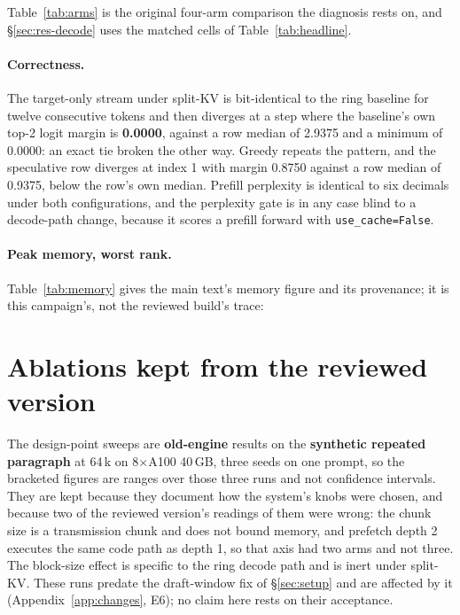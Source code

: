 \documentclass{article}
\begin{document}
Table~\ref{tab:arms} is the original four-arm comparison the diagnosis rests on, and
\S\ref{sec:res-decode} uses the matched cells of Table~\ref{tab:headline}.
\paragraph{Correctness.} The target-only stream under split-KV is bit-identical to the ring
baseline for twelve consecutive tokens and then diverges at a step where the baseline's own
top-2 logit margin is \textbf{0.0000}, against a row median of 2.9375 and a minimum of 0.0000:
an exact tie broken the other way. Greedy repeats the pattern, and the speculative row
diverges at index 1 with margin 0.8750 against a row median of 0.9375, below the row's own
median. Prefill perplexity is identical to six decimals under both configurations, and the
perplexity gate is in any case blind to a decode-path change, because it scores a prefill
forward with \texttt{use\_cache=False}.

\paragraph{Peak memory, worst rank.} Table~\ref{tab:memory} gives the main text's memory
figure and its provenance; it is this campaign's, not the reviewed build's trace:

\begin{table}[h]
\centering\footnotesize
\caption{1\,M peak memory from the CSVs. The \texttt{ring2048} diagnostic rows
(\texttt{bw\_diag\_p2}) are 16-token target-only rows and one 32-token spec row, and they are
the only rows in this release that record a worst-rank column; the split-KV campaign's own 1\,M
rows record rank 0 only. The reserved figure is what the allocator held; allocated is what the
tensors used.}
\label{tab:memory}

\end{table}

\section{Ablations kept from the reviewed version}
\label{app:ablations}

The design-point sweeps are \textbf{old-engine} results on the \textbf{synthetic repeated
paragraph} at 64\,k on 8$\times$A100 40\,GB, three seeds on one prompt, so the bracketed
figures are ranges over those three runs and not confidence intervals. They are kept because
they document how the system's knobs were chosen, and because two of the reviewed version's
readings of them were wrong: the chunk size is a transmission chunk and does not bound memory,
and prefetch depth 2 executes the same code path as depth 1, so that axis had two arms and not
three. The block-size effect is specific to the ring decode path and is inert under split-KV.
These runs predate the draft-window fix of \S\ref{sec:setup} and are affected by it
(Appendix~\ref{app:changes}, E6); no claim here rests on their acceptance.
\end{document}
